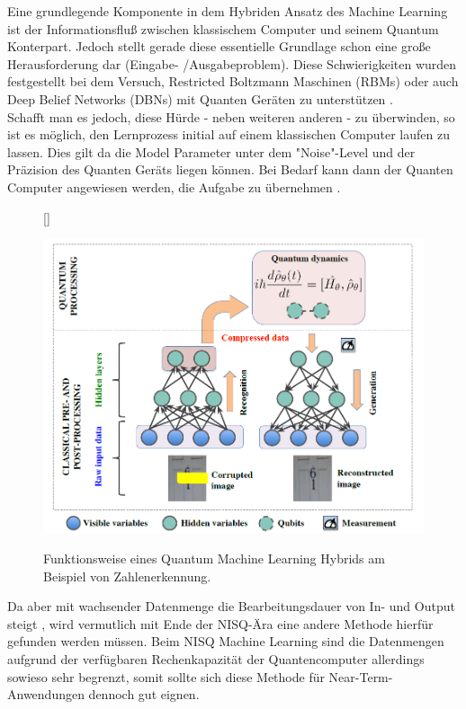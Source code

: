 Eine grundlegende Komponente in dem Hybriden Ansatz des Machine Learning ist der Informationsfluß zwischen klassischem Computer und seinem Quantum Konterpart. Jedoch stellt gerade diese essentielle Grundlage schon eine große Herausforderung dar (Eingabe- /Ausgabeproblem). Diese Schwierigkeiten wurden festgestellt bei dem Versuch, Restricted Boltzmann Maschinen (RBMs) oder auch Deep Belief Networks (DBNs) mit Quanten Geräten zu unterstützen \cite{opportunitieschallenges5}. \\

 Schafft man es jedoch, diese Hürde - neben weiteren anderen -  zu überwinden, so ist es möglich, den Lernprozess initial auf einem klassischen Computer laufen zu lassen. Dies gilt da die Model Parameter unter dem "Noise"-Level und der Präzision des Quanten Geräts liegen können. Bei Bedarf kann dann der Quanten Computer angewiesen werden, die Aufgabe zu übernehmen \cite{opportunitieschallenges5}. \\


\begin{figure}
[\FBwidth]
{\caption{Funktionsweise eines Quantum Machine Learning Hybrids am Beispiel von Zahlenerkennung. \cite{opportunitieschallenges1}}\label{fig:test}}
{\includegraphics[width=13cm]{QML/images/3-2-2.PNG}}
\end{figure}


 Da aber mit wachsender Datenmenge die Bearbeitungsdauer von In- und Output steigt \cite{biamonte2017quantum}, wird vermutlich mit Ende der NISQ-Ära eine andere Methode hierfür gefunden werden müssen. Beim NISQ Machine Learning sind die Datenmengen aufgrund der verfügbaren Rechenkapazität der Quantencomputer allerdings sowieso sehr begrenzt, somit sollte sich diese Methode für Near-Term-Anwendungen dennoch gut eignen.\\

